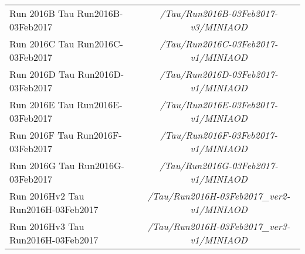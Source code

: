 \begin{table}[ht]
{\begin{tabular}{| l | c |}
\hline 
        \footnotesize Run 2016B Tau Run2016B-03Feb2017  & \footnotesize \it /Tau/Run2016B-03Feb2017-v3/MINIAOD \\
        \footnotesize Run 2016C Tau Run2016C-03Feb2017  & \footnotesize \it /Tau/Run2016C-03Feb2017-v1/MINIAOD \\
        \footnotesize Run 2016D Tau Run2016D-03Feb2017  & \footnotesize \it /Tau/Run2016D-03Feb2017-v1/MINIAOD \\
        \footnotesize Run 2016E Tau Run2016E-03Feb2017  & \footnotesize \it /Tau/Run2016E-03Feb2017-v1/MINIAOD \\
        \footnotesize Run 2016F Tau Run2016F-03Feb2017  & \footnotesize \it /Tau/Run2016F-03Feb2017-v1/MINIAOD \\
        \footnotesize Run 2016G Tau Run2016G-03Feb2017  & \footnotesize \it /Tau/Run2016G-03Feb2017-v1/MINIAOD \\
        \footnotesize Run 2016Hv2 Tau Run2016H-03Feb2017& \footnotesize \it /Tau/Run2016H-03Feb2017\_ver2-v1/MINIAOD \\
        \footnotesize Run 2016Hv3 Tau Run2016H-03Feb2017& \footnotesize \it /Tau/Run2016H-03Feb2017\_ver3-v1/MINIAOD \\%
  \hline 
  \hline 
  \end{tabular}
  }
  \label{table:datasamples} %
\end{table}


